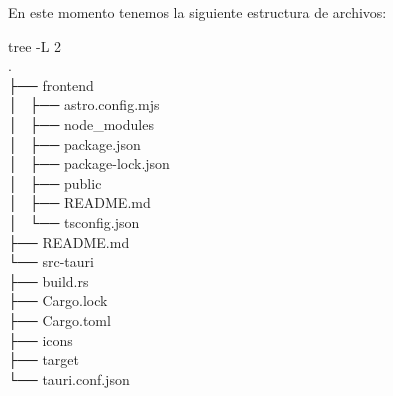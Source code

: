 \newpage
En este momento tenemos la siguiente estructura de archivos:
\begin{multicli}
    \cliarrow tree -L 2 \\
    . \\
    ├── frontend \\
    │   ├── astro.config.mjs \\
    │   ├── node\_modules \\
    │   ├── package.json \\
    │   ├── package-lock.json \\
    │   ├── public \\
    │   ├── README.md \\
    │   └── tsconfig.json \\
    ├── README.md \\
    └── src-tauri \\
    \hphantom{0.1cm}├── build.rs \\
    \hphantom{0.1cm}├── Cargo.lock \\
    \hphantom{0.1cm}├── Cargo.toml \\
    \hphantom{0.1cm}├── icons \\
    \hphantom{0.1cm}├── target \\
    \hphantom{0.1cm}└── tauri.conf.json
\end{multicli}
